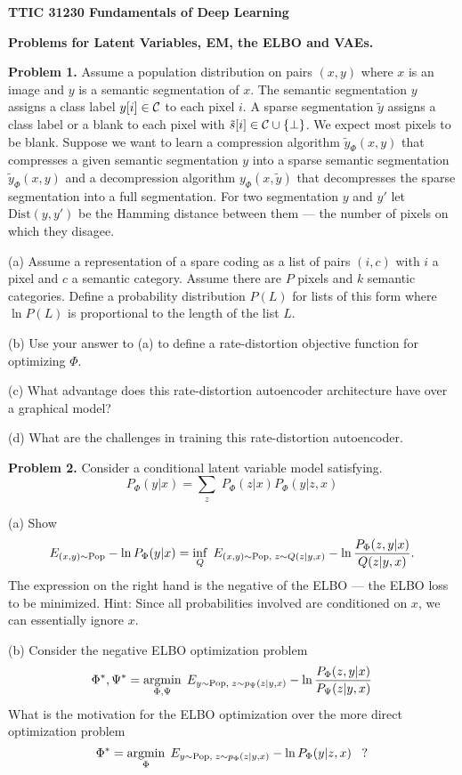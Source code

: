 \documentclass{article}
\begin{document}
\centerline{\bf TTIC 31230 Fundamentals of Deep Learning}

\bigskip

\centerline{\bf Problems for Latent Variables, EM, the ELBO and VAEs.}

\bigskip
\bigskip

{\bf Problem 1.}  Assume a population distribution on pairs $(x,y)$ where $x$ is an image and $y$ is a semantic segmentation of $x$.
The semantic segmentation $y$ assigns a class label $y[i] \in {\cal C}$ to each pixel $i$.  A sparse segmentation
$\tilde{y}$ assigns a class label or a blank to each pixel with $\tilde{s}[i] \in {\cal C} \cup \{\bot\}$. We expect most pixels to
be blank.  Suppose we want to learn a compression algorithm $\tilde{y}_\Phi(x,y)$ that compresses a given semantic segmentation
$y$ into a sparse semantic segmentation $\tilde{y}_\Phi(x,y)$ and a decompression algorithm $y_\Phi(x,\tilde{y})$ that decompresses
the sparse segmentation into a full segmentation.
For two segmentation $y$ and $y'$ let $\mathrm{Dist}(y,y')$ be the Hamming distance between them --- the number of pixels on which they disagee.

\medskip
(a) Assume a representation of a spare coding as a list of pairs $(i,c)$ with $i$ a pixel and $c$ a semantic category.
Assume there are $P$ pixels and $k$ semantic categories. Define a probability distribution $P(L)$ for lists of this form
where $\ln P(L)$ is proportional to the length of the list $L$.

\medskip
(b) Use your answer to (a) to define a rate-distortion objective function for optimizing $\Phi$.

\medskip
(c) What advantage does this rate-distortion autoencoder architecture have over a graphical model?

\medskip
(d) What are the challenges in training this rate-distortion autoencoder.

\bigskip
{\bf Problem 2.}
Consider a conditional latent variable model satisfying.
$$P_\Phi(y|x) = \sum_z\;P_\Phi(z|x)P_\Phi(y|z,x)$$

\medskip
(a) Show
$$E_{(x,y) \sim \mathrm{Pop}} - \ln P_\Phi(y|x) = \inf_Q\; E_{(x,y) \sim \mathrm{Pop}, \;z \sim Q(z|y,x)} - \ln \frac{P_\Phi(z,y|x)}{Q(z|y,x)}.$$
The expression on the right hand is the negative of the ELBO --- the ELBO loss to be minimized.
Hint: Since all probabilities involved are conditioned on $x$, we can essentially ignore $x$.

\medskip
(b) Consider the negative ELBO optimization problem
$$\Phi^*, \Psi^* = \operatorname*{argmin}_{\Phi,\Psi} \; E_{y \sim \mathrm{Pop}, \;z \sim p_\Psi(z|y,x)} - \ln \frac{P_\Phi(z,y|x)}{P_\Psi(z|y,x)}$$
What is the motivation for the ELBO optimization over the more direct optimization problem
$$\Phi^* = \operatorname*{argmin}_{\Phi} \; E_{y \sim \mathrm{Pop}, \;z \sim p_\Phi(z|y,x)} - \ln P_\Phi(y|z,x)\;\;\;\mbox{?}$$
\end{document}
